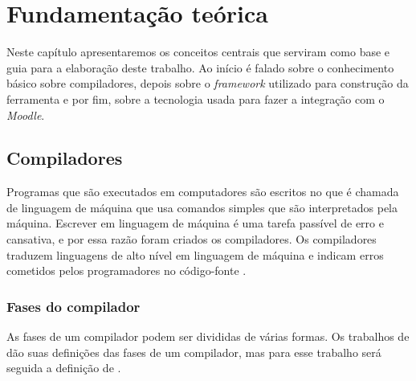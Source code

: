 \chapter{Fundamentação teórica}
\label{cap:fundamentacao-teorica}

Neste capítulo apresentaremos os conceitos centrais que serviram como base e guia para a elaboração deste trabalho. Ao início é falado sobre o conhecimento básico sobre compiladores, depois sobre o \textit{framework} utilizado para construção da ferramenta e por fim, sobre a tecnologia usada para fazer a integração com o \textit{Moodle}.

\section{Compiladores}
Programas que são executados em computadores são escritos no que é chamada de linguagem de máquina que usa comandos simples que são interpretados pela máquina. Escrever em linguagem de máquina é uma tarefa passível de erro e cansativa, e por essa razão foram criados os compiladores. Os compiladores traduzem linguagens de alto nível em linguagem de máquina e indicam erros cometidos pelos programadores no código-fonte \cite{mogensen2024introduction}.

\subsection{Fases do compilador}
As fases de um compilador podem ser divididas de várias formas. Os trabalhos de \textcite{cooper2022engineering,mogensen2024introduction, thain2020introduction} dão suas definições das fases de um compilador, mas para esse trabalho será seguida a definição de \textcite{thain2020introduction}.

\begin{figure}[ht]
    \captionsetup{width=16cm}
\end{figure}


